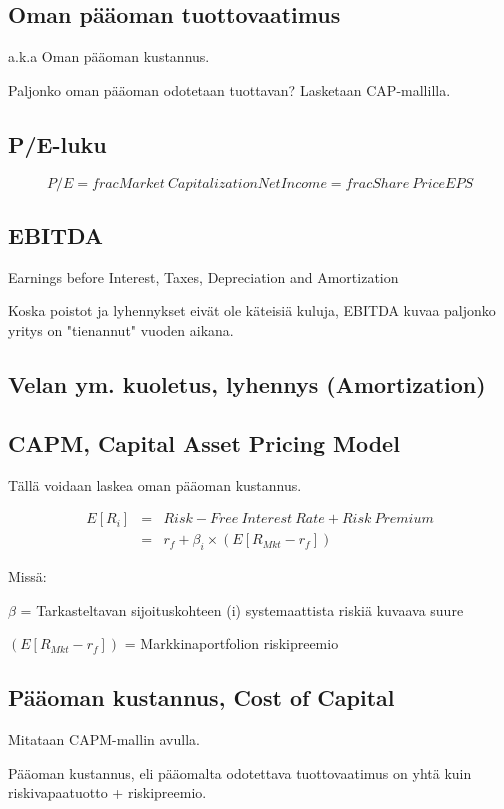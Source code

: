 \documentclass[a4paper]{article}
\begin{document}
\subsection{Oman pääoman tuottovaatimus}

a.k.a Oman pääoman kustannus.

Paljonko oman pääoman odotetaan tuottavan? Lasketaan CAP-mallilla.

\subsection{P/E-luku}

\[
    P/E = frac{Market\ Capitalization}{Net Income} = frac{Share\ Price}{EPS}
\]

\subsection{EBITDA}

Earnings before Interest, Taxes, Depreciation and Amortization

Koska poistot ja lyhennykset eivät ole käteisiä kuluja, EBITDA kuvaa paljonko yritys on "tienannut" vuoden aikana.

\subsection{Velan ym. kuoletus, lyhennys (Amortization)}



\subsection{CAPM, Capital Asset Pricing Model}

Tällä voidaan laskea oman pääoman kustannus.

\[
\begin{array}{lcl}
E[R_i] & = & Risk-Free\ Interest\ Rate + Risk\ Premium \\
 & = & r_f + \beta_i \times ( E [R_{Mkt} - r_f] )
\end{array}
\]

Missä:

$\beta$ = Tarkasteltavan sijoituskohteen (i) systemaattista riskiä kuvaava suure

$( E [R_{Mkt} - r_f] )$ = Markkinaportfolion riskipreemio

\subsection{Pääoman kustannus, Cost of Capital}

Mitataan CAPM-mallin avulla. 

Pääoman kustannus, eli pääomalta odotettava tuottovaatimus on yhtä kuin riskivapaatuotto + riskipreemio.
\end{document}
